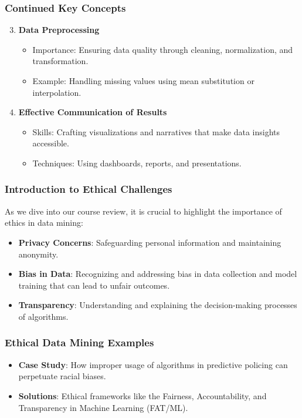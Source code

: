 \documentclass[aspectratio=169]{beamer}
\begin{document}
\begin{frame}[fragile]
    \frametitle{Continued Key Concepts}
    \begin{enumerate}
        \setcounter{enumi}{2}
        \item \textbf{Data Preprocessing}
            \begin{itemize}
                \item Importance: Ensuring data quality through cleaning, normalization, and transformation.
                \item Example: Handling missing values using mean substitution or interpolation.
            \end{itemize}
        \item \textbf{Effective Communication of Results}
            \begin{itemize}
                \item Skills: Crafting visualizations and narratives that make data insights accessible.
                \item Techniques: Using dashboards, reports, and presentations.
            \end{itemize}
    \end{enumerate}
\end{frame}

\begin{frame}[fragile]
    \frametitle{Introduction to Ethical Challenges}
    As we dive into our course review, it is crucial to highlight the importance of ethics in data mining:
    \begin{itemize}
        \item \textbf{Privacy Concerns}: Safeguarding personal information and maintaining anonymity.
        \item \textbf{Bias in Data}: Recognizing and addressing bias in data collection and model training that can lead to unfair outcomes.
        \item \textbf{Transparency}: Understanding and explaining the decision-making processes of algorithms.
    \end{itemize}
\end{frame}

\begin{frame}[fragile]
    \frametitle{Ethical Data Mining Examples}
    \begin{itemize}
        \item \textbf{Case Study}: How improper usage of algorithms in predictive policing can perpetuate racial biases.
        \item \textbf{Solutions}: Ethical frameworks like the Fairness, Accountability, and Transparency in Machine Learning (FAT/ML).
    \end{itemize}
\end{frame}
\end{document}
